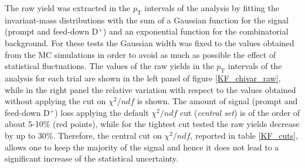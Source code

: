 \documentclass[b5paper,10pt,twoside,oldstyle,classica]{toptesi}
\newcommand{\pt}{p_\text{T}}
\begin{document}
The raw yield was extracted in the $\pt$ intervals of the analysis by fitting the invariant-mass distributions with the sum of a Gaussian function for the signal (prompt and feed-down D$^+$) and an exponential function for the combinatorial background. For these tests the Gaussian width was fixed to the values obtained from the MC simulations in order to avoid as much as possible the effect of statistical fluctuations. The values of the raw yields in the $\pt$ intervals of the analysis for each trial are shown in the left panel of figure \ref{KF_chivar_raw}, while in the right panel the relative variation with respect to the values obtained without applying the cut on $\chi^2/ndf$ is shown. The amount of signal (prompt and feed-down D$^+$) loss applying the default $\chi^2/ndf$ cut (\textit{central set}) is of the order of about 5-10\% (red points), while for the tightest cut tested the raw yields decrease by up to 30\%. Therefore, the central cut on $\chi^2/ndf$, reported in table \ref{KF_cuts}, allows one to keep the majority of the signal and hence it does not lead to a significant increase of the statistical uncertainty.   
\end{document}
